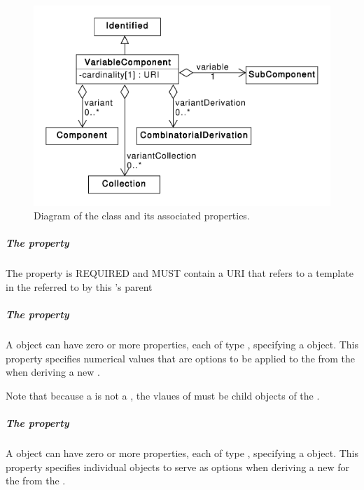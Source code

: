 \begin{figure}[ht]
\begin{center}
\includegraphics[scale=0.6]{uml/variable_component}
\caption[]{Diagram of the  class and its associated properties.}
\label{uml:variable_component}
\end{center}
\end{figure}

\subparagraph{The  property}\label{sec:variable}

The  property is REQUIRED and MUST contain a URI that refers to a template  in the   referred to by this 's parent 

\subparagraph{The  property}\label{sec:variantMeasure}

A  object can have zero or more  properties, each of type , specifying a  object. This property specifies numerical values that are options to be applied to the   from the  when deriving a new .

Note that because a  is not a , the vlaues of  must be child objects of the .

\subparagraph{The  property}\label{sec:variant}

A  object can have zero or more  properties, each of type , specifying a  object. This property specifies individual  objects to serve as options when deriving a new  for the   from the .

